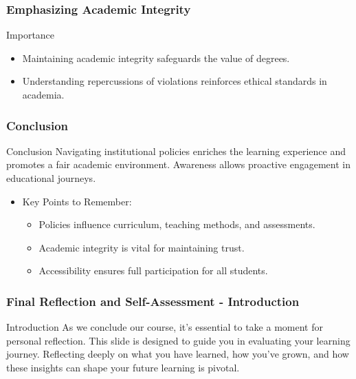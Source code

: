 \documentclass[aspectratio=169]{beamer}
\begin{document}
\begin{frame}[fragile]
    \frametitle{Emphasizing Academic Integrity}
    \begin{block}{Importance}
        \begin{itemize}
            \item Maintaining academic integrity safeguards the value of degrees.
            \item Understanding repercussions of violations reinforces ethical standards in academia.
        \end{itemize}
    \end{block}
\end{frame}

\begin{frame}[fragile]
    \frametitle{Conclusion}
    \begin{block}{Conclusion}
        Navigating institutional policies enriches the learning experience and promotes a fair academic environment. Awareness allows proactive engagement in educational journeys.
    \end{block}
    \begin{itemize}
        \item Key Points to Remember:
        \begin{itemize}
            \item Policies influence curriculum, teaching methods, and assessments.
            \item Academic integrity is vital for maintaining trust.
            \item Accessibility ensures full participation for all students.
        \end{itemize}
    \end{itemize}
\end{frame}

\begin{frame}[fragile]
    \frametitle{Final Reflection and Self-Assessment - Introduction}
    \begin{block}{Introduction}
        As we conclude our course, it's essential to take a moment for personal reflection. 
        This slide is designed to guide you in evaluating your learning journey. 
        Reflecting deeply on what you have learned, how you've grown, and how these insights can shape your future learning is pivotal.
    \end{block}
\end{frame}
\end{document}
